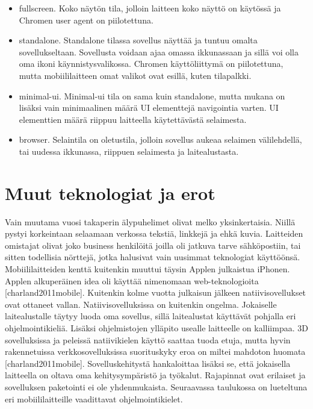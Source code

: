 \documentclass{tktltiki}
\begin{document}
\begin{itemize}
  \item fullscreen. Koko näytön tila, jolloin laitteen koko näyttö on käytössä ja Chromen user agent on piilotettuna.
  \item standalone. Standalone tilassa sovellus näyttää ja tuntuu omalta sovellukseltaan. Sovellusta voidaan ajaa omassa ikkunassaan ja sillä voi olla oma ikoni käynnistysvalikossa. Chromen käyttöliittymä on piilotettuna, mutta mobiililaitteen omat valikot ovat esillä, kuten tilapalkki. 
  \item minimal-ui. Minimal-ui tila on sama kuin standalone, mutta mukana on lisäksi vain minimaalinen määrä UI elementtejä navigointia varten. UI elementtien määrä riippuu laitteella käytettävästä selaimesta. 
  \item browser. Selaintila on oletustila, jolloin sovellus aukeaa selaimen välilehdellä, tai uudessa ikkunassa, riippuen selaimesta ja laitealustasta. 
\end{itemize}

\clearpage
\section{Muut teknologiat ja erot}

Vain muutama vuosi takaperin älypuhelimet olivat melko yksinkertaisia. Niillä pystyi korkeintaan selaamaan verkossa tekstiä, linkkejä ja ehkä kuvia. Laitteiden omistajat olivat joko business henkilöitä joilla oli jatkuva tarve sähköpostiin, tai sitten todellisia nörttejä, jotka halusivat vain uusimmat teknologiat käyttöönsä. Mobiililaitteiden kenttä kuitenkin muuttui täysin Applen julkaistua iPhonen. Applen alkuperäinen idea oli käyttää nimenomaan web-teknologioita [charland2011mobile]. Kuitenkin kolme vuotta julkaisun jälkeen natiivisovellukset ovat ottaneet vallan. Natiivisovelluksissa on kuitenkin ongelma. Jokaiselle laitealustalle täytyy luoda oma sovellus, sillä laitealustat käyttävät pohjalla eri ohjelmointikieliä. Lisäksi ohjelmistojen ylläpito usealle laitteelle on kalliimpaa. 3D sovelluksissa ja peleissä natiivikielen käyttö saattaa tuoda etuja, mutta hyvin rakennetuissa verkkosovelluksissa suorituskyky eroa on miltei mahdoton huomata [charland2011mobile]. Sovelluskehitystä hankaloittaa lisäksi se, että jokaisella laitteella on oltava oma kehitysympäristö ja työkalut. Rajapinnat ovat erilaiset ja sovelluksen paketointi ei ole yhdenmukaista. Seuraavassa taulukossa on lueteltuna eri mobiililaitteille vaadittavat ohjelmointikielet.
\end{document}
